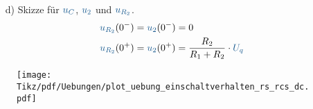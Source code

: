 {\begin{minipage}{0.5\textwidth}
\begin{itemize}
    \item[d)] Skizze für $\ecv{u_C}$, $\ecv{u_2}$ und $\ecv{u_{R_2}}$.
    \begin{align*}
        \ecv{u_{R_2}}(0^-) &= \ecv{u_2}(0^-) = 0 \\
        \ecv{u_{R_2}}(0^+) &= \ecv{u_2}(0^+) = \frac{R_2}{R_1+R_2} \cdot \ecv{U_q}%
    \end{align*}
\end{itemize}
\end{minipage}%
\begin{minipage}{0.5\textwidth}
\begin{figure}[H]
    \texttt{[image: Tikz/pdf/Uebungen/plot\_uebung\_einschaltverhalten\_rs\_rcs\_dc.pdf]}
\end{figure}
\end{minipage}
\newpage %
}



